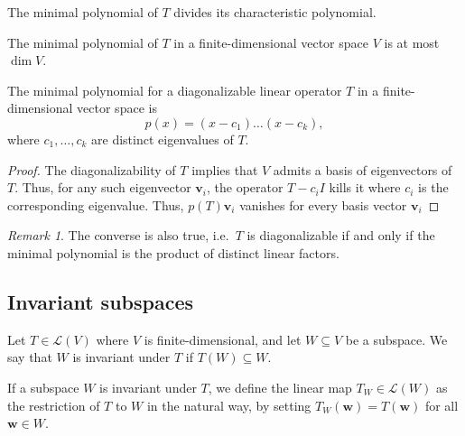 \documentclass[11pt]{article}
\renewcommand{\vec}[1]{\boldsymbol{#1}}
\newcommand{\vv}{\vec{v}}
\newcommand{\vw}{\vec{w}}
\newcommand{\alg}[1]{\mathscr{#1}}
\newcommand{\algL}{\alg{L}}
\newcommand{\dim}{\operatorname{dim}}
\theoremstyle{definition}
\theoremstyle{remark}
\newtheorem*{remark}{Remark}
\numberwithin{equation}{section}
\begin{document}
    \begin{corollary}
        The minimal polynomial of $T$ divides its characteristic polynomial.
    \end{corollary}
    \begin{corollary}
        The minimal polynomial of $T$ in a finite-dimensional vector space $V$ is
        at most $\dim{V}$.
    \end{corollary}

    \begin{theorem}
        The minimal polynomial for a diagonalizable linear operator $T$ in a
        finite-dimensional vector space is \[
            p(x) = (x - c_1) \dots (x - c_k),
        \] where $c_1, \dots, c_k$ are distinct eigenvalues of $T$.
    \end{theorem}
    \begin{proof}
        The diagonalizability of $T$ implies that $V$ admits a basis of eigenvectors
        of $T$. Thus, for any such eigenvector $\vv_i$, the operator $T - c_iI$ kills
        it where $c_i$ is the corresponding eigenvalue. Thus, $p(T)\vv_i$ vanishes
        for every basis vector $\vv_i$
    \end{proof}
    \begin{remark}
        The converse is also true, i.e.\ $T$ is diagonalizable if and only if the
        minimal polynomial is the product of distinct linear factors.
    \end{remark}

    \subsection{Invariant subspaces}

    \begin{definition}
        Let $T \in \algL(V)$ where $V$ is finite-dimensional, and let $W \subseteq V$
        be a subspace. We say that $W$ is invariant under $T$ if $T(W) \subseteq W$.

        If a subspace $W$ is invariant under $T$, we define the linear map
        $T_W \in\algL(W)$ as the restriction of $T$ to $W$ in the natural way, by
        setting $T_W(\vw) = T(\vw)$ for all $\vw \in W$.
    \end{definition}
\end{document}
